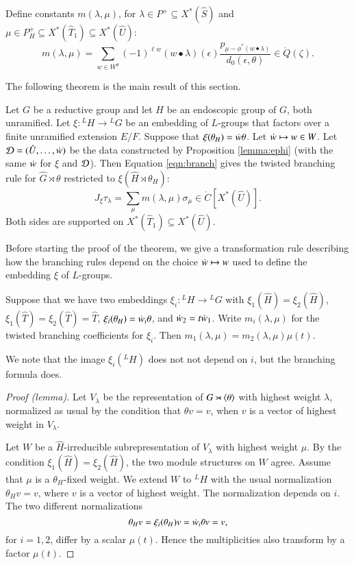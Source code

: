 Define constants $m(\lambda,\mu)$, for $\lambda\in P^+\subseteq
X^*(\hat S)$ and $\mu\in P_H^+ \subseteq X^*(\hat T_1)\subseteq
X^*(\hat U)$:
\begin{equation}\label{eqn:branch}
m(\lambda,\mu) = \sum_{w\in W^\theta} 
(-1)^{\ell w} ({w\bullet\lambda})(\epsilon)
\frac{p_{\mu-\phi^*(w\bullet\lambda)}}{d_0(\epsilon,\theta)} \in \ring{Q}(\zeta).
\end{equation}

The following theorem is the main result of this section.

\begin{theorem}\label{thm:branch}
  Let $G$ be a reductive group and let $H$ be an endoscopic group of
  $G$, both unramified.  Let $\xi:{}^LH\to {}^LG$ be an embedding of
  $L$-groups that factors over a finite unramified extension $E/F$.
  Suppose that $\xi(\theta_H) = \dot w\theta$.  Let $\dot w\mapsto w\in W$.
  Let $\mathcal D=(\hat U,\ldots,\dot w)$ be the data constructed by
  Proposition \ref{lemma:ephi} (with the same $\dot w$ for $\xi$ and $\mathcal D$).  
  Then Equation \ref{eqn:branch} gives
  the twisted branching rule for $\hat G\rtimes \theta$ restricted to
  $\xi(\hat H\rtimes \theta_H)$:
\[
J_\xi \tau_\lambda = \sum_\mu m(\lambda,\mu) \sigma_\mu \in
\ring{C}[X^*(\hat U)].
\]
Both sides are supported on $X^*(\hat T_1)\subseteq X^*(\hat U)$.
\end{theorem}

Before starting the proof of the theorem, we give a transformation rule
describing how the branching
rules depend on the choice $\dot w\mapsto w$ 
used to define the embedding $\xi$ of $L$-groups.  


\begin{lemma}\label{lemma:transform}
Suppose that we have two embeddings $\xi_i:{}^LH\to {}^LG$ with
$\xi_1(\hat H) =\xi_2(\hat H)$, $\xi_1(\hat T) = \xi_2(\hat T) = \hat T$, 
$\xi_i(\theta_H) = \dot w_i\theta$, and $\dot w_2 = t\dot w_1$.
Write $m_i(\lambda,\mu)$ for the twisted branching coefficients for $\xi_i$.
Then $m_1(\lambda,\mu) = m_2(\lambda,\mu)\mu(t)$.
\end{lemma}

We note that the image $\xi_i({}^LH)$ does not not depend on 
$i$, but the branching formula does.

\begin{proof}[Proof (lemma)]  
Let $V_\lambda$ be the representation of $G\rtimes \langle{\theta}\rangle$ with
highest weight $\lambda$, normalized as usual by the condition that $\theta v=v$,
when $v$ is a vector of highest weight in $V_\lambda$.

Let $W$ be a $\hat H$-irreducible subrepresentation of $V_\lambda$
with highest weight $\mu$.  By the condition
$\xi_1(\hat H) =\xi_2(\hat H)$, the two module structures on $W$
agree.  Assume that $\mu$ is a $\theta_H$-fixed weight.  We extend $W$
to ${}^LH$ with the usual normalization $\theta_H v = v$, where $v$ is
a vector of highest weight.  The normalization depends on $i$.
The two different normalizations
\[
\theta_H v = \xi_i(\theta_H) v = \dot w_i \theta v =v,
\]
for $i=1,2$, 
differ by a scalar $\mu(t)$.  
Hence the multiplicities also transform by a factor $\mu(t)$.
\end{proof}

